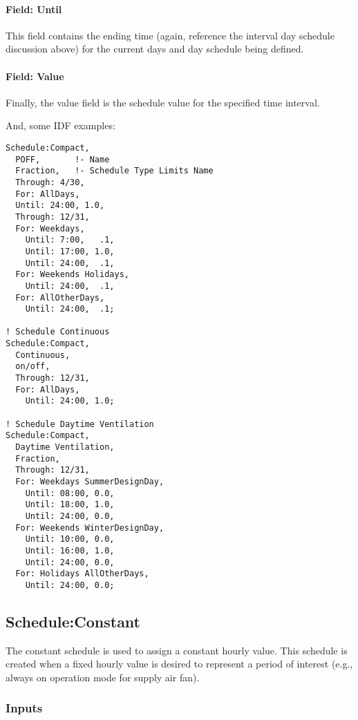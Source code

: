 \paragraph{Field: Until}\label{field-until}

This field contains the ending time (again, reference the interval day schedule discussion above) for the current days and day schedule being defined.

\paragraph{Field: Value}\label{field-value-1}

Finally, the value field is the schedule value for the specified time interval.

And, some IDF examples:

\begin{lstlisting}
Schedule:Compact,
  POFF,       !- Name
  Fraction,   !- Schedule Type Limits Name
  Through: 4/30,
  For: AllDays,
  Until: 24:00, 1.0,
  Through: 12/31,
  For: Weekdays,
    Until: 7:00,   .1,
    Until: 17:00, 1.0,
    Until: 24:00,  .1,
  For: Weekends Holidays,
    Until: 24:00,  .1,
  For: AllOtherDays,
    Until: 24:00,  .1;

! Schedule Continuous
Schedule:Compact,
  Continuous,
  on/off,
  Through: 12/31,
  For: AllDays,
    Until: 24:00, 1.0;

! Schedule Daytime Ventilation
Schedule:Compact,
  Daytime Ventilation,
  Fraction,
  Through: 12/31,
  For: Weekdays SummerDesignDay,
    Until: 08:00, 0.0,
    Until: 18:00, 1.0,
    Until: 24:00, 0.0,
  For: Weekends WinterDesignDay,
    Until: 10:00, 0.0,
    Until: 16:00, 1.0,
    Until: 24:00, 0.0,
  For: Holidays AllOtherDays,
    Until: 24:00, 0.0;
\end{lstlisting}

\subsection{Schedule:Constant}\label{scheduleconstant}

The constant schedule is used to assign a constant hourly value. This schedule is created when a fixed hourly value is desired to represent a period of interest (e.g., always on operation mode for supply air fan).

\subsubsection{Inputs}\label{inputs-8-021}

